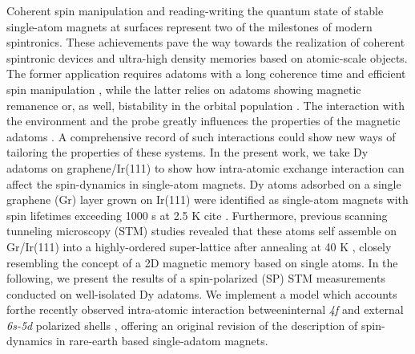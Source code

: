 \documentclass[
reprint,amsmath,amssymb,aps]{revtex4-2}
\begin{document}
Coherent spin manipulation and reading-writing the quantum state of stable single-atom magnets \cite{Natterer2017,yang2019} at surfaces represent two of the milestones of modern spintronics. These achievements pave the way towards the realization of coherent spintronic devices and ultra-high density memories based on atomic-scale objects. The former application requires adatoms with a long coherence time and efficient spin manipulation \cite{baumannElectronParamagneticResonance2015,yang2019}, while the latter relies on adatoms showing magnetic remanence \cite{baltic2018,donatiMagneticRemanenceSingle2016,Natterer2018} or, as well, bistability in the orbital population \cite{kiralyOrbitallyDerivedSingleatom2018,kiraly_AtomicBoltzmannMachine_2021}. The interaction with the environment and the probe greatly influences the properties of the magnetic adatoms \cite{malavolti_MinimallyInvasiveSpin_2020}. A comprehensive record of such interactions could show new ways of tailoring the properties of these systems.  In the present work, we take Dy adatoms on graphene/Ir(111) to show how intra-atomic exchange interaction can affect the spin-dynamics in single-atom magnets. Dy atoms adsorbed on a single graphene (Gr) layer grown on Ir(111) were identified  as single-atom  magnets with spin lifetimes exceeding 1000 s at 2.5 K cite \cite{baltic2016}.  Furthermore, previous scanning  tunneling  microscopy  (STM)  studies  revealed that these  atoms  self  assemble on Gr/Ir(111) into  a  highly-ordered  super-lattice  after  annealing  at  40  K \cite{pivettaDirectCaptureElectrostatic2018}, closely resembling the concept of a 2D magnetic memory based on single atoms. In the following, we present the results of a spin-polarized (SP) STM  measurements conducted  on  well-isolated  Dy  adatoms. We implement a model which accounts forthe  recently  observed  intra-atomic  interaction  betweeninternal \textit{4f} and  external \textit{6s-5d} polarized  shells  \cite{pivettaMeasuringIntraAtomicExchange2020}, offering  an  original  revision  of  the  description  of   spin-dynamics  in  rare-earth  based  single-adatom  magnets.
\end{document}
